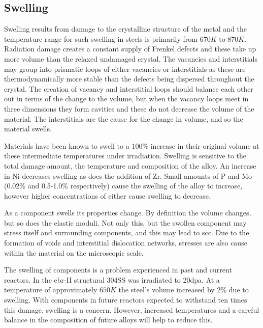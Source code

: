 \FloatBarrier

\subsection{Swelling}

Swelling results from damage to the crystalline structure of the metal and the temperature range for such swelling in steels is primarily from $670K$ to $870K$.  Radiation damage creates a constant supply of Frenkel defects and these take up more volume than the relaxed undamaged crystal.  The vacancies and interstitials may group into prismatic loops of either vacancies or interstitials as these are thermodynamically more stable than the defects being dispersed throughout the crystal\cite{prisloopscnm}.  The creation of vacancy and interstitial loops should balance each other out in terms of the change to the volume, but when the vacancy loops meet in three dimensions they form cavities and these do not decrease the volume of the material\cite{prisloops2}.  The interstitials are the cause for the change in volume, and so the material swells. 

Materials have been known to swell to a 100\% increase in their original volume at these intermediate temperatures under irradiation\cite{wasstrucaustenitic}.  Swelling is sensitive to the total damage amount, the temperature and composition of the alloy.  An increase in Ni decreases swelling as does the addition of Zr.  Small amounts of \Gls{P} and Mo (0.02\% and 0.5-1.0\% respectively) cause the swelling of the alloy to increase, however higher concentrations of either cause swelling to decrease\cite{swellingris}.

As a component swells its properties change.  By definition the volume changes, but so does the elastic moduli.  Not only this, but the swollen component may stress itself and surrounding components, and this may lead to \acrshort{scc}.  Due to the formation of voids and interstitial dislocation networks, stresses are also cause within the material on the microscopic scale.

The swelling of components is a problem experienced in past and current reactors.  In the \acrshort{ebr}-II structural \gls{304SS} was irradiated to 20\acrshort{dpa}.  At a temperature of approximately $650K$ the steel's volume increased by 2\% due to swelling\cite{radisandvoid}.  With components in future reactors expected to withstand ten times this damage, swelling is a concern.  However, increased temperatures and a careful balance in the composition of future alloys will help to reduce this.



